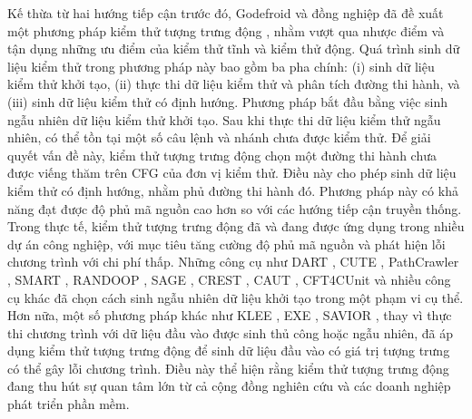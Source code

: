 Kế thừa từ hai hướng tiếp cận trước đó, Godefroid và đồng nghiệp đã đề xuất một phương pháp kiểm thử tượng trưng động \cite{ConcolicTesting}, nhằm vượt qua nhược điểm và tận dụng những ưu điểm của kiểm thử tĩnh và kiểm thử động. Quá trình sinh dữ liệu kiểm thử trong phương pháp này bao gồm ba pha chính: (i) sinh dữ liệu kiểm thử khởi tạo, (ii) thực thi dữ liệu kiểm thử và phân tích đường thi hành, và (iii) sinh dữ liệu kiểm thử có định hướng. Phương pháp bắt đầu bằng việc sinh ngẫu nhiên dữ liệu kiểm thử khởi tạo. Sau khi thực thi dữ liệu kiểm thử ngẫu nhiên, có thể tồn tại một số câu lệnh và nhánh chưa được kiểm thử. Để giải quyết vấn đề này, kiểm thử tượng trưng động chọn một đường thi hành chưa được viếng thăm trên CFG của đơn vị kiểm thử. Điều này cho phép sinh dữ liệu kiểm thử có định hướng, nhằm phủ đường thi hành đó. Phương pháp này có khả năng đạt được độ phủ mã nguồn cao hơn so với các hướng tiếp cận truyền thống. Trong thực tế, kiểm thử tượng trưng động đã và đang được ứng dụng trong nhiều dự án công nghiệp, với mục tiêu tăng cường độ phủ mã nguồn và phát hiện lỗi chương trình với chi phí thấp. Những công cụ như DART \cite{DART}, CUTE \cite{CUTE}, PathCrawler \cite{PathCrawler}, SMART \cite{SMART}, RANDOOP \cite{FeedbackDirectedRandomTestGeneration}, SAGE \cite{SAGE}, CREST \cite{HeuristicsForScalableDynamicTestGeneration}, CAUT \cite{CAUT}, CFT4CUnit \cite{AMethodForAutomatedUnitTestingOfCPrograms} và nhiều công cụ khác đã chọn cách sinh ngẫu nhiên dữ liệu khởi tạo trong một phạm vi cụ thể. Hơn nữa, một số phương pháp khác như KLEE \cite{KLEE}, EXE \cite{EXE}, SAVIOR \cite{SAVIOR}, thay vì thực thi chương trình với dữ liệu đầu vào được sinh thủ công hoặc ngẫu nhiên, đã áp dụng kiểm thử tượng trưng động để sinh dữ liệu đầu vào có giá trị tượng trưng có thể gây lỗi chương trình. Điều này thể hiện rằng kiểm thử tượng trưng động đang thu hút sự quan tâm lớn từ cả cộng đồng nghiên cứu và các doanh nghiệp phát triển phần mềm.

